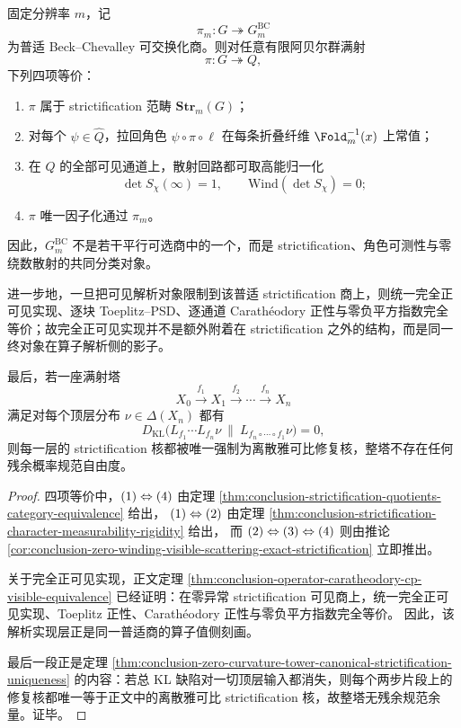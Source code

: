 \begin{theorem}\label{thm:derived-strictification-terminality-fivefold}
固定分辨率 \(m\)，记
\[
\pi_m:G\twoheadrightarrow G_m^{\mathrm{BC}}
\]
为普适 Beck--Chevalley 可交换化商。则对任意有限阿贝尔群满射
\[
\pi:G\twoheadrightarrow Q,
\]
下列四项等价：
\begin{enumerate}
\normalfont
  \item \(\pi\) 属于 strictification 范畴 \(\mathbf{Str}_m(G)\)；
  \item 对每个 \(\psi\in\widehat Q\)，拉回角色 \(\psi\circ\pi\circ\ell\) 在每条折叠纤维 \(\Fold_m^{-1}(x)\) 上常值；
  \item 在 \(Q\) 的全部可见通道上，散射回路都可取高能归一化
  \[
  \det S_\chi(\infty)=1,
  \qquad
  \mathrm{Wind}(\det S_\chi)=0;
  \]
  \item \(\pi\) 唯一因子化通过 \(\pi_m\)。
\end{enumerate}
因此，\(G_m^{\mathrm{BC}}\) 不是若干平行可选商中的一个，而是 strictification、角色可测性与零绕数散射的共同分类对象。

进一步地，一旦把可见解析对象限制到该普适 strictification 商上，则统一完全正可见实现、逐块 Toeplitz--PSD、逐通道 Carath\'eodory 正性与零负平方指数完全等价；故完全正可见实现并不是额外附着在 strictification 之外的结构，而是同一终对象在算子解析侧的影子。

最后，若一座满射塔
\[
X_0\xrightarrow{f_1}X_1\xrightarrow{f_2}\cdots\xrightarrow{f_n}X_n
\]
满足对每个顶层分布 \(\nu\in\Delta(X_n)\) 都有
\[
D_{\mathrm{KL}}\!\bigl(L_{f_1}\cdots L_{f_n}\nu\ \|\ L_{f_n\circ\cdots\circ f_1}\nu\bigr)=0,
\]
则每一层的 strictification 核都被唯一强制为离散雅可比修复核，整塔不存在任何残余概率规范自由度。
\end{theorem}

\begin{proof}
四项等价中，\(\textup{(1)}\Leftrightarrow\textup{(4)}\) 由定理
\ref{thm:conclusion-strictification-quotients-category-equivalence} 给出，
\(\textup{(1)}\Leftrightarrow\textup{(2)}\) 由定理
\ref{thm:conclusion-strictification-character-measurability-rigidity} 给出，
而 \(\textup{(2)}\Leftrightarrow\textup{(3)}\Leftrightarrow\textup{(4)}\) 则由推论
\ref{cor:conclusion-zero-winding-visible-scattering-exact-strictification} 立即推出。

关于完全正可见实现，正文定理
\ref{thm:conclusion-operator-caratheodory-cp-visible-equivalence}
已经证明：在零异常 strictification 可见商上，统一完全正可见实现、Toeplitz 正性、Carath\'eodory 正性与零负平方指数完全等价。
因此，该解析实现层正是同一普适商的算子值侧刻画。

最后一段正是定理
\ref{thm:conclusion-zero-curvature-tower-canonical-strictification-uniqueness}
的内容：若总 KL 缺陷对一切顶层输入都消失，则每个两步片段上的修复核都唯一等于正文中的离散雅可比 strictification 核，故整塔无残余规范余量。证毕。
\end{proof}

